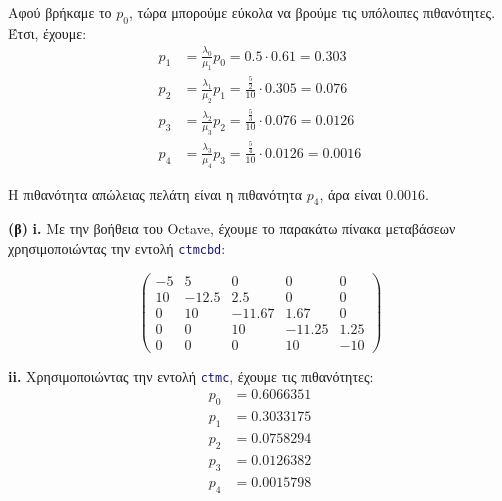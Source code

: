 \documentclass {article}
\newcommand{\english}[1]{\foreignlanguage{english}{#1}}
\begin{document}
Αφού βρήκαμε το $p_0$, τώρα μπορούμε εύκολα να βρούμε τις υπόλοιπες πιθανότητες. Έτσι, έχουμε: 
\begin{equation}
	\begin{split}
		p_1 & = \frac{λ_0}{μ_1}p_0 = 0.5 \cdot 0.61 = 0.303\\
		p_2 & = \frac{λ_1}{μ_2}p_1 = \frac{\frac{5}{2}}{10} \cdot 0.305 = 0.076\\
		p_3 & = \frac{λ_2}{μ_3}p_2 = \frac{\frac{5}{3}}{10} \cdot 0.076 = 0.0126\\
		p_4 & = \frac{λ_3}{μ_4}p_3 = \frac{\frac{5}{4}}{10} \cdot 0.0126 = 0.0016 
 	\end{split}
\end{equation}

Η πιθανότητα απώλειας πελάτη είναι η πιθανότητα $p_4$, άρα είναι $0.0016$.

\textbf{(β)} \textbf{\english{i.}} Με την βοήθεια του \english{Octave}, έχουμε το παρακάτω πίνακα μεταβάσεων χρησιμοποιώντας την εντολή \english{\lstinline[language=Matlab]{ctmcbd}}:

\begin{equation*}
	\begin{pmatrix} 
		-5 &     5 &       0 &     0 &    0\\
		10 & -12.5 &     2.5 &     0 &    0\\
		0 &     10 & -11.67 &   1.67 &    0\\
		0 &      0 &     10 & -11.25 & 1.25\\
		0 &      0 &      0 &     10 &  -10
	\end{pmatrix}
\end{equation*}

\textbf{\english{ii.}} Χρησιμοποιώντας την εντολή \english{\lstinline[language=Matlab]{ctmc}}, έχουμε τις πιθανότητες:
\begin{equation}
	\begin{split}
		p_0 & = 0.6066351\\
		p_1 & = 0.3033175\\
		p_2 & = 0.0758294\\
		p_3 & = 0.0126382\\
		p_4 & = 0.0015798
	\end{split}
\end{equation}
\end{document}
